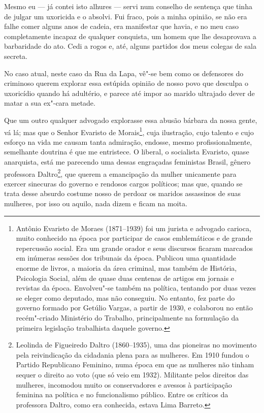 Mesmo eu --- já contei isto alhures --- servi num conselho de sentença que
tinha de julgar um uxoricida e o absolvi. Fui fraco, pois a minha
opinião, se não era falhe comer alguns anos de cadeia, era manifestar
que havia, e no meu caso completamente incapaz de qualquer conquista, um
homem que lhe desaprovava a barbaridade do ato. Cedi a rogos e, até,
alguns partidos dos meus colegas de sala secreta.

No caso atual, neste caso da Rua da Lapa, vê"-se bem como os defensores
do criminoso querem explorar essa estúpida opinião de nosso povo que
desculpa o uxoricídio quando há adultério, e parece até impor ao marido
ultrajado dever de matar a sua ex"-cara metade.

Que um outro qualquer advogado explorasse essa abusão bárbara da nossa
gente, vá lá; mas que o Senhor Evaristo de Morais\footnote{Antônio
  Evaristo de Moraes (1871--1939) foi um jurista e advogado carioca,
  muito conhecido na época por participar de casos emblemáticos e de
  grande repercussão social. Era um grande orador e seus discursos
  ficaram marcados em inúmeras sessões dos tribunais da época. Publicou
  uma quantidade enorme de livros, a maioria da área criminal, mas
  também de História, Psicologia Social, além de quase duas centenas de
  artigos em jornais e revistas da época. Envolveu"-se também na
  política, tentando por duas vezes se eleger como deputado, mas não
  conseguiu. No entanto, fez parte do governo formado por Getúlio
  Vargas, a partir de 1930, e colaborou no então recém"-criado Ministério
  do Trabalho, principalmente na formulação da primeira legislação
  trabalhista daquele governo.}, cuja ilustração, cujo talento e cujo
esforço na vida me causam tanta admiração, endosse, mesmo
profissionalmente, semelhante doutrina é que me entristece. O liberal, o
socialista Evaristo, quase anarquista, está me parecendo uma dessas
engraçadas feministas Brasil, gênero professora Daltro\footnote{Leolinda
  de Figueiredo Daltro (1860--1935), uma das pioneiras no movimento
  pela reivindicação da cidadania plena para as mulheres. Em 1910 fundou
  o Partido Republicano Feminino, numa época em que as mulheres não
  tinham sequer o direito ao voto (que só veio em 1932). Militante pelos
  direitos das mulheres, incomodou muito os conservadores e avessos à
  participação feminina na política e no funcionalismo público. Entre os
  críticos da professora Daltro, como era conhecida, estava Lima
  Barreto.}, que querem a emancipação da mulher unicamente para exercer
sinecuras do governo e rendosos cargos políticos; mas que, quando se
trata desse absurdo costume nosso de perdoar os maridos assassinos de
suas mulheres, por isso ou aquilo, nada dizem e ficam na moita.

